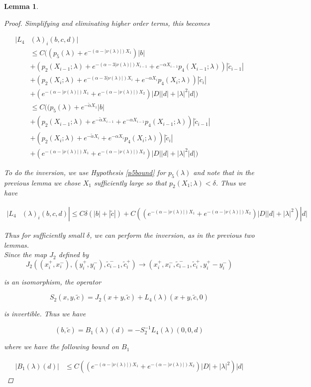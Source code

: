 \documentclass[12pt]{article}
\newtheorem{lemma}{Lemma}
\begin{document}
\begin{lemma}
\begin{proof}
Simplifying and eliminating higher order terms, this becomes

\begin{align*}
|L_4&(\lambda)_i(b, c, d)|\\
&\leq C \Big(
(p_5(\lambda) + e^{-(\alpha - |\nu(\lambda)|) X_1}) |b| \\
&+ (p_2(X_{i-1}; \lambda) + e^{-(\alpha - 3 |\nu(\lambda)|) X_{i-1}} + e^{-\alpha X_{i-1}} p_4(X_{i-1}; \lambda) ) |\tilde{c}_{i-1}| \\
&+ (p_2(X_i; \lambda) + e^{-(\alpha - 3 |\nu(\lambda)|) X_i} + e^{-\alpha X_i} p_4(X_i; \lambda) )|\tilde{c}_i| \\
&+ (e^{-(\alpha - |\nu(\lambda)|) X_1} + e^{-(\alpha - |\nu(\lambda)|) X_2})|D||d| + |\lambda|^2|d|
\Big) \\
&\leq C \Big(
(p_5(\lambda) + e^{-\tilde{\alpha} X_1}  |b| \\
&+ (p_2(X_{i-1}; \lambda) + e^{-\tilde{\alpha} X_{i-1}} + e^{-\alpha X_{i-1}} p_4(X_{i-1}; \lambda) ) |\tilde{c}_{i-1}| \\
&+ (p_2(X_i; \lambda) + e^{-\tilde{\alpha} X_i} + e^{-\alpha X_i} p_4(X_i; \lambda) )|\tilde{c}_i| \\
&+ (e^{-(\alpha - |\nu(\lambda)|) X_1} + e^{-(\alpha - |\nu(\lambda)|) X_2})|D||d| + |\lambda|^2|d|
\Big)
\end{align*}

To do the inversion, we use Hypothesis \ref{p5bound} for $p_5(\lambda)$ and note that in the previous lemma we chose $X_1$ sufficiently large so that $p_2(X_1; \lambda) < \delta$. Thus we have

\begin{align*}
|L_4&(\lambda)_i(b, c, d)| \leq C \delta (|b| + |\tilde{c}|) + C ( (e^{-(\alpha - |\nu(\lambda)|) X_1} + e^{-(\alpha - |\nu(\lambda)|) X_2})|D||d|+ |\lambda|^2)|d|
\end{align*}

Thus for sufficiently small $\delta$, we can perform the inversion, as in the previous two lemmas.\\

Since the map $J_2$ defined by
\[
J_2( (x_i^+, x_i^-),(y_i^+, y_i^-), \tilde{c}_{i-1}^-, \tilde{c}_i^+ ) \rightarrow ( x_i^+, x_i^-, \tilde{c}_{i-1}^-, \tilde{c}_i^+, y_i^+ -  y_i^- )
\]

is an isomorphism, the operator

\[
S_2(x,y, \tilde{c}) = J_2(x+y, \tilde{c}) + L_4(\lambda)(x+y,\tilde{c}, 0)
\]

is invertible. Thus we have

\begin{equation}
(b,\tilde{c}) = B_1(\lambda)(d) = -S_2^{-1} L_4(\lambda)(0, 0, d)
\end{equation}

where we have the following bound on $B_1$

\begin{align*}
|B_1(\lambda)(d)| &\leq C ( (e^{-(\alpha - |\nu(\lambda)|) X_1} + e^{-(\alpha - |\nu(\lambda)|) X_2})|D| + |\lambda|^2 )|d|
\end{align*}
 
\end{proof}
\end{lemma}
\end{document}
